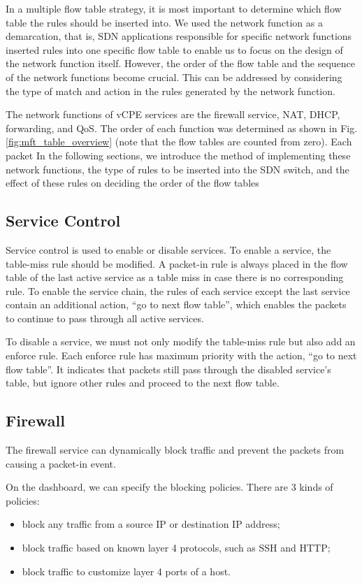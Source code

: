 \documentclass[10pt,journal]{IEEEtran}
\begin{document}
In a multiple flow table strategy, it is most important to determine which flow table the rules should be inserted into. We used the network function as a demarcation, that is, SDN applications responsible for specific network functions inserted rules into one specific flow table to enable us to focus on the design of the network function itself. However, the order of the flow table and the sequence of the network functions become crucial. This can be addressed by considering the type of match and action in the rules generated by the network function.

The network functions of vCPE services are the firewall service, NAT, DHCP, forwarding, and QoS. The order of each function was determined as shown in Fig. \ref{fig:mft_table_overview} (note that the flow tables are counted from zero). Each packet In the following sections, we introduce the method of implementing these network functions, the type of rules to be inserted into the SDN switch, and the effect of these rules on deciding the order of the flow tables



\subsection{Service Control}
Service control is used to enable or disable services. To enable a service, the table-miss rule should be modified. A packet-in rule is always placed in the flow table of the last active service as a table miss in case there is no corresponding rule. To enable the service chain, the rules of each service except the last service contain an additional action, ``go to next flow table'', which enables the packets to continue to pass through all active services.

To disable a service, we must not only modify the table-miss rule but also add an enforce rule. Each enforce rule has maximum priority with the action, ``go to next flow table''. It indicates that packets still pass through the disabled service’s table, but ignore other rules and proceed to the next flow table.



\subsection{Firewall}
The firewall service can dynamically block traffic and prevent the packets from causing a packet-in event.

On the dashboard, we can specify the blocking policies. There are 3 kinds of policies:
\begin{itemize}[]
\item block any traffic from a source IP or destination IP address;
\item block traffic based on known layer 4 protocols, such as SSH and HTTP;
\item block traffic to customize layer 4 ports of a host.
\end{itemize}
\end{document}
